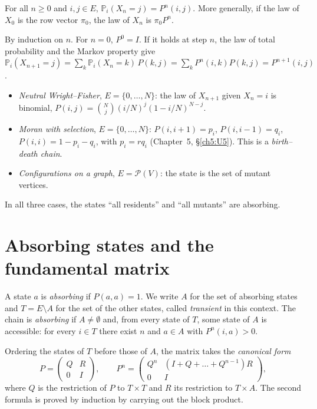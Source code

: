 \begin{proposition}\label{appB:prop:ck}
For all $n\ge0$ and $i,j\in E$, $\mathbb P_i(X_n=j)=P^n(i,j)$. More generally, if the law of $X_0$ is the row vector
$\pi_0$, the law of $X_n$ is $\pi_0P^n$.
\end{proposition}

\begin{humanproof}
By induction on $n$. For $n=0$, $P^0=I$. If it holds at step $n$, the law of total probability and the
Markov property give
$\mathbb P_i(X_{n+1}=j)=\sum_k\mathbb P_i(X_n=k)\,P(k,j)=\sum_kP^n(i,k)P(k,j)=P^{n+1}(i,j)$.
\end{humanproof}

\begin{example}
\begin{itemize}
\item \emph{Neutral Wright--Fisher}, $E=\{0,\dots,N\}$: the law of $X_{n+1}$ given $X_n=i$ is binomial,
$P(i,j)=\binom Nj(i/N)^j(1-i/N)^{N-j}$.
\item \emph{Moran with selection}, $E=\{0,\dots,N\}$: $P(i,i+1)=p_i$, $P(i,i-1)=q_i$, $P(i,i)=1-p_i-q_i$, with $p_i=rq_i$
(Chapter~5, §\ref{ch5:U5}). This is a \emph{birth--death chain}.
\item \emph{Configurations on a graph}, $E=\mathcal P(V)$: the state is the set of mutant vertices.
\end{itemize}
In all three cases, the states ``all residents'' and ``all mutants'' are absorbing.
\end{example}

\section{Absorbing states and the fundamental matrix}\label{appB:sec:abs}

\begin{definition}
A state $a$ is \emph{absorbing} if $P(a,a)=1$. We write $A$ for the set of absorbing states and $T=E\setminus A$ for
the set of the other states, called \emph{transient} in this context. The chain is \emph{absorbing} if $A\ne\emptyset$
and, from every state of $T$, some state of $A$ is accessible: for every $i\in T$ there exist $n$ and $a\in A$ with
$P^n(i,a)>0$.
\end{definition}

Ordering the states of $T$ before those of $A$, the matrix takes the \emph{canonical form}
\[P=\begin{pmatrix}Q&R\\0&I\end{pmatrix},\qquad P^n=\begin{pmatrix}Q^n&(I+Q+\dots+Q^{n-1})R\\0&I\end{pmatrix},\]
where $Q$ is the restriction of $P$ to $T\times T$ and $R$ its restriction to $T\times A$. The second formula is proved
by induction by carrying out the block product.

